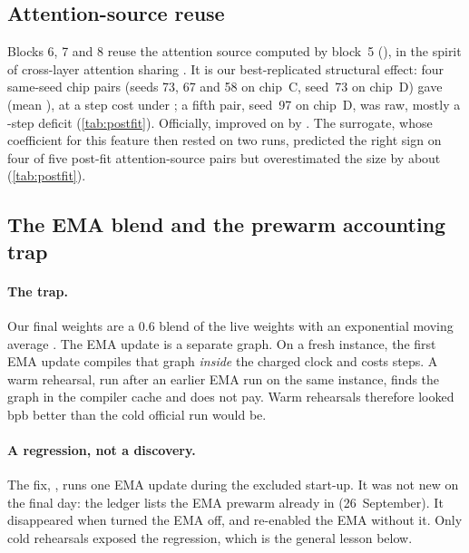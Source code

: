\subsection{Attention-source reuse}
\label{sec:asr}

Blocks 6, 7 and 8 reuse the attention source computed by block~5 (), in the spirit of
cross-layer attention sharing \citep{brandon2024cla,xiao2019sharing}. It is our best-replicated structural effect:
four same-seed chip pairs (seeds 73, 67 and 58 on chip~C, seed~73 on chip~D) gave \docnum{} (mean
), at a step cost under \docnum{}; a fifth pair, seed~97 on chip~D, was
\docnum{} raw, mostly a \docnum{}-step deficit (\cref{tab:postfit}).
Officially,  improved on  by . The surrogate, whose coefficient for this feature
then rested on two runs, predicted the right sign on four of five post-fit attention-source pairs but overestimated
the size by about \docnum{} (\cref{tab:postfit}).

\subsection{The EMA blend and the prewarm accounting trap}
\label{sec:prewarm}

\paragraph{The trap.} Our final weights are a 0.6 blend of the live weights with an exponential moving average
\citep{polyak1992averaging,moralesbrotons2024ema}. The EMA update is a separate graph. On a fresh instance, the first
EMA update compiles that graph \emph{inside} the charged clock and costs \docnum{} steps. A warm
rehearsal, run after an earlier EMA run on the same instance, finds the graph in the compiler cache and does not pay.
Warm rehearsals therefore looked \docnum{} bpb better than the cold official run would be.

\paragraph{A regression, not a discovery.} The fix, , runs one EMA update during the excluded
start-up. It was not new on the final day: the ledger lists the EMA prewarm already in 
(26~September). It disappeared when  turned the EMA off, and  re-enabled the EMA
without it. Only cold rehearsals exposed the regression, which is the general lesson below.

